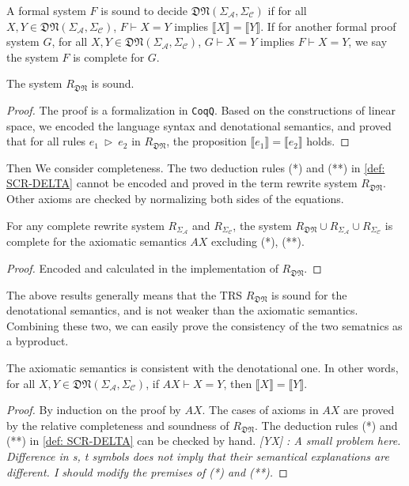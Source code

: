 \documentclass[manuscript, review, timestamp]{acmart}
\newcommand{\yx}[1]{\textit{\color{blue}[YX] : #1}}
\newcommand*{\reduce}{\ \triangleright\ }
\newcommand*{\sem}[1]{\llbracket #1 \rrbracket}
\begin{document}
\begin{definition}
  A formal system $F$ is sound to decide $\mathfrak{DN}(\Sigma_\mathcal{A}, \Sigma_\mathcal{C})$ if for all $X, Y \in \mathfrak{DN}(\Sigma_\mathcal{A}, \Sigma_\mathcal{C})$, $F \vdash X = Y$ implies $\sem{X} = \sem{Y}$. If for another formal proof system $G$, for all $X, Y \in \mathfrak{DN}(\Sigma_\mathcal{A}, \Sigma_\mathcal{C})$, $G \vdash X = Y$ implies $F \vdash X = Y$, we say the system $F$ is complete for $G$.
\end{definition}

\begin{lemma}
  The system $R_\mathfrak{DN}$ is sound.
\end{lemma}
\begin{proof}
  The proof is a formalization in \texttt{CoqQ}. Based on the constructions of linear space, we encoded the language syntax and denotational semantics, and proved that for all rules $e_1 \reduce e_2$ in $R_\mathfrak{DN}$, the proposition $\sem{e_1} = \sem{e_2}$ holds.
\end{proof}

Then We consider completeness. The two deduction rules (*) and (**) in \ref{def: SCR-DELTA} cannot be encoded and proved in the term rewrite system $R_\mathfrak{DN}$. Other axioms are checked by normalizing both sides of the equations.

\begin{lemma}
  For any complete rewrite system $R_{\Sigma_\mathcal{A}}$ and $R_{\Sigma_\mathcal{C}}$, the system $R_\mathfrak{DN}\cup R_{\Sigma_\mathcal{A}} \cup R_{\Sigma_\mathcal{C}}$ is complete for the axiomatic semantics $AX$ excluding (*), (**).
\end{lemma}
\begin{proof}
  Encoded and calculated in the implementation of $R_\mathfrak{DN}$.
\end{proof}

The above results generally means that the TRS $R_\mathfrak{DN}$ is sound for the denotational semantics, and is not weaker than the axiomatic semantics. Combining these two, we can easily prove the consistency of the two sematnics as a byproduct.

\begin{corollary}
  The axiomatic semantics is consistent with the denotational one. In other words, for all $X, Y \in \mathfrak{DN}(\Sigma_\mathcal{A}, \Sigma_\mathcal{C})$, if $AX \vdash X = Y$, then $\sem{X} = \sem{Y}$.
\end{corollary}
\begin{proof}
  By induction on the proof by $AX$. The cases of axioms in $AX$ are proved by the relative completeness and soundness of $R_\mathfrak{DN}$. The deduction rules (*) and (**) in \ref{def: SCR-DELTA} can be checked by hand.
  \yx{A small problem here. Difference in s, t symbols does not imply that their semantical explanations are different. I should modify the premises of (*) and (**).}
\end{proof}
\end{document}
